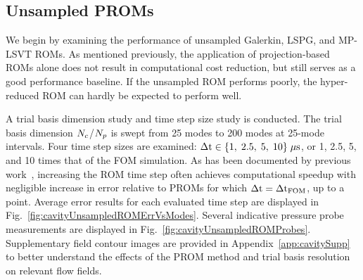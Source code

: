 \subsection{Unsampled PROMs}

We begin by examining the performance of unsampled Galerkin, LSPG, and MP-LSVT ROMs. As mentioned previously, the application of projection-based ROMs alone does not result in computational cost reduction, but still serves as a good performance baseline. If the unsampled ROM performs poorly, the hyper-reduced ROM can hardly be expected to perform well.

A trial basis dimension study and time step size study is conducted. The trial basis dimension $N_c$/$N_p$ is swept from 25 modes to 200 modes at 25-mode intervals. Four time step sizes are examined: $\Delta \text{t} \in \{ 1, \; 2.5, \; 5, \; 10 \} \; \mu \text{s}$, or 1, 2.5, 5, and 10 times that of the FOM simulation. As has been documented by previous work~\cite{Carlberg2017,Huang2022,Wentland2021}, increasing the ROM time step often achieves computational speedup with negligible increase in error relative to PROMs for which $\Delta \text{t} = \Delta \text{t}_{\text{FOM}}$, up to a point. Average error results for each evaluated time step are displayed in Fig.~\ref{fig:cavityUnsampledROMErrVsModes}. Several indicative pressure probe measurements are displayed in Fig.~\ref{fig:cavityUnsampledROMProbes}. Supplementary field contour images are provided in Appendix~\ref{app:cavitySupp} to better understand the effects of the PROM method and trial basis resolution on relevant flow fields.

